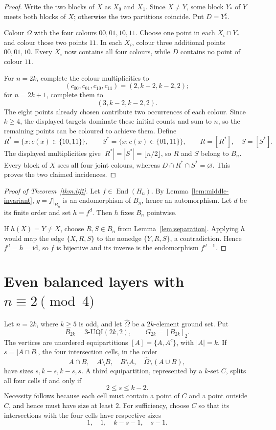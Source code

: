\documentclass[11pt]{article}
\DeclareMathOperator{\End}{End}
\begin{document}
\begin{proof}
Write the two blocks of \(X\) as \(X_0\) and \(X_1\).  Since \(X\ne Y\), some block
\(Y_*\) of \(Y\) meets both blocks of \(X\); otherwise the two partitions
coincide.  Put \(D=Y_*^c\).

Colour \(\Omega\) with the four colours \(00,01,10,11\).  Choose one point
in each \(X_i\cap Y_*\) and colour those two points \(11\).  In each \(X_i\),
colour three additional points \(00,01,10\).  Every \(X_i\) now contains
all four colours, while \(D\) contains no point of colour \(11\).

For \(n=2k\), complete the colour multiplicities to
\[
(c_{00},c_{01},c_{10},c_{11})=(2,k-2,k-2,2);
\]
for \(n=2k+1\), complete them to
\[
(3,k-2,k-2,2).
\]
The eight points already chosen contribute two occurrences of each colour.
Since \(k\ge4\), the displayed targets dominate these initial counts and sum
to \(n\), so the remaining points can be coloured to achieve them.  Define
\[
R^*=\{x:c(x)\in\{10,11\}\},
\qquad
S^*=\{x:c(x)\in\{01,11\}\},
\qquad R=[R^*],\quad S=[S^*].
\]
The displayed multiplicities give
\(|R^*|=|S^*|=\lfloor n/2\rfloor\), so \(R\) and \(S\) belong to \(B_n\).  Every block of
\(X\) sees all four joint colours, whereas \(D\cap R^*\cap S^*=\varnothing\).
This proves the two claimed incidences.
\end{proof}

\begin{proof}[Proof of Theorem~\ref{thm:lift}]
Let \(f\in\End(H_n)\).  By Lemma~\ref{lem:middle-invariant},
\(g=f|_{B_n}\) is an endomorphism of \(B_n\), hence an automorphism.  Let
\(d\) be its finite order and set \(h=f^d\).  Then \(h\) fixes \(B_n\)
pointwise.

If \(h(X)=Y\ne X\), choose \(R,S\in B_n\) from
Lemma~\ref{lem:separation}.  Applying \(h\) would map the edge \(\{X,R,S\}\) to the
nonedge \(\{Y,R,S\}\), a contradiction.  Hence \(f^d=h=\mathrm{id}\), so
\(f\) is bijective and its inverse is the endomorphism \(f^{d-1}\).
\end{proof}

\section{Even balanced layers with
\texorpdfstring{\(n\equiv2\pmod4\)}{n congruent to 2 modulo 4}}

Let \(n=2k\), where \(k\ge5\) is odd, and let \(\widehat\Omega\) be a
\(2k\)-element ground set.  Put
\[
B_{2k}=3\text{-}\mathrm{UQI}(2k,2),
\qquad G_{2k}=[B_{2k}]_2.
\]
The vertices are unordered equipartitions \([A]=\{A,A^c\}\), with
\(|A|=k\).  If \(s=|A\cap B|\), the four intersection cells, in the order
\[
A\cap B,\quad A\setminus B,\quad B\setminus A,\quad
\widehat\Omega\setminus(A\cup B),
\]
have sizes \(s,k-s,k-s,s\).  A third equipartition, represented by a
\(k\)-set \(C\), splits all four cells if and only if
\[
2\le s\le k-2.
\]
Necessity follows because each cell must contain a point of \(C\) and a
point outside \(C\), and hence must have size at least \(2\).  For
sufficiency, choose \(C\) so that its intersections with the four cells have
respective sizes
\[
1,\quad 1,\quad k-s-1,\quad s-1.
\]
\end{document}
